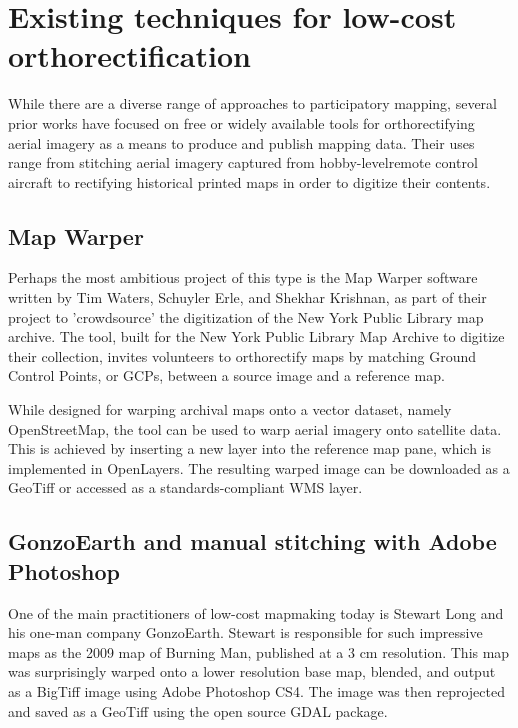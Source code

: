 \documentclass[11pt]{report}
\begin{document}
\section{Existing techniques for low-cost orthorectification}

While there are a diverse range of approaches to participatory mapping, several prior works have focused on free or widely available tools for orthorectifying aerial imagery as a means to produce and publish mapping data. Their uses range from stitching aerial imagery captured from hobby-levelremote control aircraft to rectifying historical printed maps in order to digitize their contents.

\subsection{Map Warper}

Perhaps the most ambitious project of this type is the Map Warper software written by Tim Waters, Schuyler Erle, and Shekhar Krishnan, as part of their project to 'crowdsource' the digitization of the New York Public Library map archive. \cite{waters2009warper} The tool, built for the New York Public Library Map Archive to digitize their collection, invites volunteers to orthorectify maps by matching Ground Control Points, or GCPs, between a source image and a reference map. 

While designed for warping archival maps onto a vector dataset, namely OpenStreetMap, the tool can be used to warp aerial imagery onto satellite data. This is achieved by inserting a new layer into the reference map pane, which is implemented in OpenLayers. The resulting warped image can be downloaded as a GeoTiff or accessed as a standards-compliant WMS layer. 

\subsection{GonzoEarth and manual stitching with Adobe Photoshop}

One of the main practitioners of low-cost mapmaking today is Stewart Long and his one-man company GonzoEarth. Stewart is responsible for such impressive maps as the 2009 map of Burning Man, published at a 3 cm resolution. This map was surprisingly warped onto a lower resolution base map, blended, and output as a BigTiff image using Adobe Photoshop CS4. The image was then reprojected and saved as a GeoTiff using the open source GDAL package.
\end{document}
